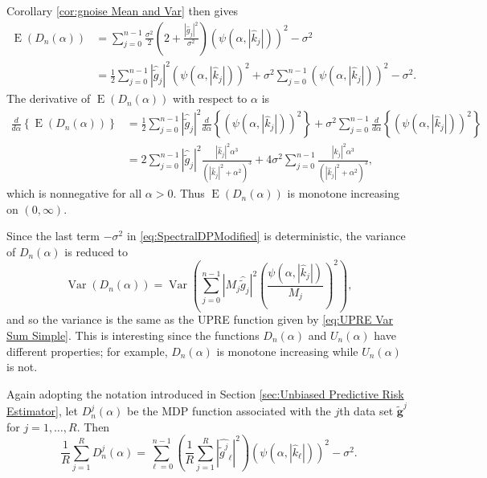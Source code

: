 \documentclass[12pt]{article}
\newcommand{\gnoise}{\widetilde{g}}	%
\newcommand{\gnoiseVec}{\widetilde{\mathbf{g}}}	%
\newcommand{\regparam}{\alpha}
\newcommand{\mfilt}{\psi}
\newcommand{\noiseSD}{\sigma}	%
\DeclareMathOperator{\Var}{Var}	%
\DeclareMathOperator{\E}{E}	%
\newcommand{\U}{U}	%
\newcommand{\D}{D}	%
\begin{document}
Corollary \ref{cor:gnoise Mean and Var} then gives
\begin{align*}
\E(\D_n(\regparam)) &= \sum_{j = 0}^{n-1} \frac{\noiseSD^2}{2}\left(2 + \frac{|\widehat{g}_j|^2}{\noiseSD^2}\right)(\mfilt(\regparam,|\widehat{k}_j|))^2 - \noiseSD^2 \\
&= \frac{1}{2}\sum_{j = 0}^{n-1} |\widehat{\gnoise}_j|^2(\mfilt(\regparam,|\widehat{k}_j|))^2 + \noiseSD^2\sum_{j = 0}^{n-1} (\mfilt(\regparam,|\widehat{k}_j|))^2 - \noiseSD^2.
\end{align*}
The derivative of $\E(\D_n(\regparam))$ with respect to $\regparam$ is
\begin{align*}
\frac{d}{d\regparam}\left\{\E\left(\D_n(\regparam)\right)\right\} &= \frac{1}{2}\sum_{j = 0}^{n-1} |\widehat{\gnoise}_j|^2 \frac{d}{d\regparam}\left\{(\mfilt(\regparam,|\widehat{k}_j|))^2\right\} + \noiseSD^2\sum_{j = 0}^{n-1} \frac{d}{d\regparam}\left\{(\mfilt(\regparam,|\widehat{k}_j|))^2\right\} \\
&= 2\sum_{j = 0}^{n-1} |\widehat{\gnoise}_j|^2\frac{|\widehat{k}_j|^2\regparam^3}{\left(|\widehat{k}_j|^2 + \regparam^2\right)^3} + 4\noiseSD^2 \sum_{j = 0}^{n-1} \frac{|\widehat{k}_j|^2\regparam^3}{\left(|\widehat{k}_j|^2 + \regparam^2\right)^3},
\end{align*}
which is nonnegative for all $\regparam > 0$. Thus $\E(\D_n(\regparam))$ is monotone increasing on $(0,\infty)$. \par
Since the last term $-\noiseSD^2$ in \eqref{eq:SpectralDPModified} is deterministic, the variance of $\D_n(\regparam)$ is reduced to
\[\Var(\D_n(\regparam)) = \Var\left(\sum_{j = 0}^{n-1} |M_j\widehat{\gnoise}_j|^2\left(\frac{\mfilt(\regparam,|\widehat{k}_j|)}{M_j}\right)^2\right),\]
and so the variance is the same as the UPRE function given by \eqref{eq:UPRE Var Sum Simple}. This is interesting since the functions  $\D_n(\regparam)$ and $\U_n(\regparam)$ have different properties; for example, $\D_n(\regparam)$ is monotone increasing while $\U_n(\regparam)$ is not. \par 
Again adopting the notation introduced in Section \ref{sec:Unbiased Predictive Risk Estimator}, let $\D_n^j(\regparam)$ be the MDP function associated with the $j$th data set $\gnoiseVec^j$ for $j = 1,\ldots,R$. Then 
\begin{equation}
\frac{1}{R}\sum_{j=1}^R \D_n^j(\regparam)  = \sum_{\ell = 0}^{n-1} \left(\frac{1}{R} \sum_{j=1}^R |\widehat{\gnoise^j}_\ell|^2\right)(\mfilt(\regparam,|\widehat{k}_\ell|))^2 - \noiseSD^2. 
\label{eq:SpectralDPavg}
\end{equation}
\end{document}
